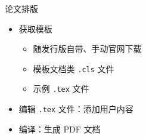 \begin{frame}{论文排版}
    \begin{itemize}
      \item 获取模板
        \begin{itemize}
          \item 随发行版自带、手动官网下载
          \item 模板文档类 \texttt{.cls} 文件
          \item 示例 \texttt{.tex} 文件
        \end{itemize}
      \item 编辑 \texttt{.tex} 文件：添加用户内容
      \item 编译：生成 PDF 文档
    \end{itemize}
  \end{frame}
  



